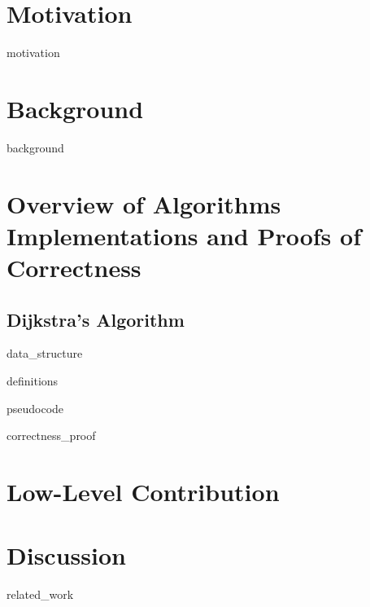 \documentclass[11pt, a4paper]{article} %
\theoremstyle{definition}
\begin{document}
\section{Motivation}
{motivation}

\section{Background}
{background}

\section{Overview of Algorithms Implementations and Proofs of Correctness}
\subsection{Dijkstra's Algorithm}
{data_structure}

{definitions}

{pseudocode}

{correctness_proof}


\section{Low-Level Contribution}




\section{Discussion}



{related_work}
\end{document}
